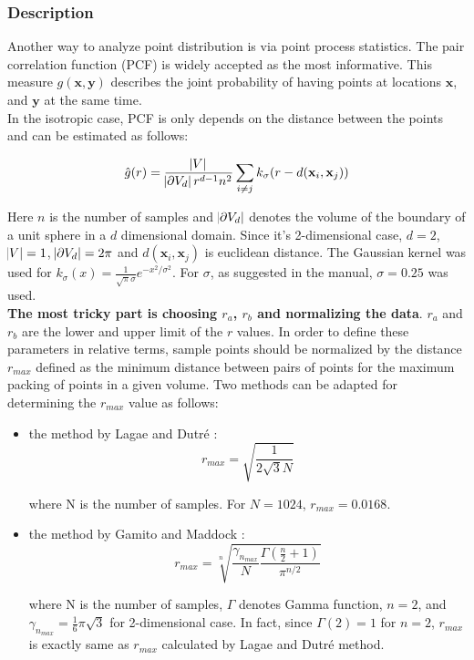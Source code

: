 \documentclass[paper=a4, fontsize=11pt]{scrartcl} %
\numberwithin{equation}{section} %
\numberwithin{figure}{section} %
\numberwithin{table}{section} %
\renewcommand{\vec}[1]{\mathbf{#1}}
\begin{document}
\subsubsection{Description}

Another way to analyze point distribution is via point process statistics. The pair correlation function (PCF) is widely accepted as the most informative. This measure $g(\vec{x}, \vec{y})$ describes the joint probability of having points at locations $\vec{x}$, and $\vec{y}$ at the same time. 
\\

In the isotropic case, PCF is only depends on the distance between the points and can be estimated as follows:

\begin{equation}
	\hat{g}(r) = \frac{\abs{V}}{\abs{\partial V_d} r^{d-1} n^2} \sum_{i \neq j} k_\sigma (r - d(\vec{x}_i, \vec{x}_j))
\end{equation}

Here $n$ is the number of samples and $\abs{\partial V_d}$ denotes the volume of the boundary of a unit sphere in a $d$ dimensional domain. Since it's 2-dimensional case, $d = 2$, $\abs{V} = 1$, $\abs{\partial V_d} = 2 \pi$ and $d(\vec{x}_i, \vec{x}_j)$ is euclidean distance. The Gaussian kernel was used for $k_\sigma(x) = \frac{1}{\sqrt{\pi} \sigma} e^{-x^2 / \sigma^2}$. For $\sigma$, as suggested in the manual, $\sigma = 0.25$ was used. \\

\textbf{The most tricky part is choosing $r_a$, $r_b$ and normalizing the data}. $r_a$ and $r_b$ are the lower and upper limit of the $r$ values. In order to define these parameters in relative terms, sample points should be normalized by the distance $r_{max}$ defined as the minimum distance between pairs of points for the maximum packing of points in a given volume.\cite{oztireli2012analysis} Two methods can be adapted for determining the $r_{max}$ value as follows:

\begin{itemize}
	\item the method by Lagae and Dutr\'{e} \cite{lagae2008comparison}:
	\begin{equation}
		r_{max} = \sqrt{\frac{1}{2\sqrt{3} N}}
	\end{equation}
	
	where N is the number of samples. For $N = 1024$, $r_{max} = 0.0168$.
	
	\item the method by Gamito and Maddock \cite{gamito2009accurate}: 
	\begin{equation}
		r_{max} = \sqrt[n]{\frac{\gamma_{n_{max}}}{N} \frac{\Gamma(\frac{n}{2} + 1)}{\pi^{n/2}}}
	\end{equation}  
	
	where N is the number of samples, $\Gamma$ denotes Gamma function, $n = 2$, and $\gamma_{n_{max}} = \frac{1}{6} \pi \sqrt{3}$ for 2-dimensional case. In fact, since $\Gamma(2) = 1$ for $n = 2$, $r_{max}$ is exactly same as $r_{max}$ calculated by Lagae and Dutr\'{e} method.
\end{itemize}
\end{document}
